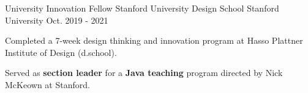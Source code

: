 \begin{cventries}
\cvopenentry
    {University Innovation Fellow}
    {Stanford University Design School}
    {Stanford University}
    {Oct. 2019 - 2021}
    {
    \begin{cvitems}
      \item {Completed a 7-week design thinking and innovation program at Hasso Plattner Institute of Design (d.school).}
      \item {Served as \textbf{section leader} for a \textbf{Java teaching} program directed by Nick McKeown at Stanford.}
    \end{cvitems}
    }
\end{cventries}
